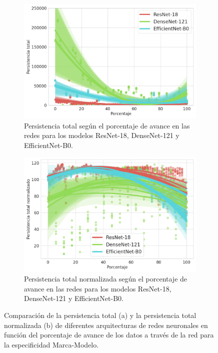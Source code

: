 \begin{figure}[H]
	\centering
	\begin{subfigure}
		{.5\textwidth}
		\centering
		\includegraphics[width=\linewidth]{img/mm_arch.png}
		\caption{Persistencia total según el porcentaje de avance en las redes para
			los modelos ResNet-18, DenseNet-121 y EfficientNet-B0.}
		\label{fig:mm-homology-arch-1}
	\end{subfigure}%
	\begin{subfigure}
		{.5\textwidth}
		\centering
		\includegraphics[width=\linewidth]{img/mm_arch_norm.png}
		\caption{Persistencia total normalizada según el porcentaje de avance en las
			redes para los modelos ResNet-18, DenseNet-121 y EfficientNet-B0.}
		\label{fig:mm-homology-arch-2}
	\end{subfigure}
	\caption{Comparación de la persistencia total (a) y la persistencia total
		normalizada (b) de diferentes arquitecturas de redes neuronales en función del
		porcentaje de avance de los datos a través de la red para la especificidad
		Marca-Modelo.}
	\label{fig:mm-homology-arch}
\end{figure}

